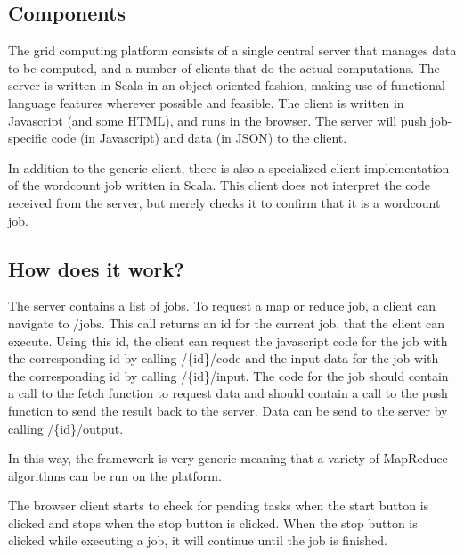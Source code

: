 
\subsection{Components}
The grid computing platform consists of a single central server that manages
data to be computed, and a number of clients that do the actual computations.
The server is written in Scala in an object-oriented fashion, making use of
functional language features wherever possible and feasible. The client is
written in Javascript (and some HTML), and runs in the browser. The server will
push job-specific code (in Javascript) and data (in JSON) to the client.

In addition to the generic client, there is also a specialized client
implementation of the wordcount job written in Scala. This client does not
interpret the code received from the server, but merely checks it to confirm
that it is a wordcount job.
	
	\subsection{How does it work?}
		The server contains a list of jobs. To request a map or reduce job, a client can navigate to /jobs. 
		This call returns an id for the current job, that the client can execute. Using this id, 
		the client can request the javascript code for the job with the corresponding id by calling /\{id\}/code
		and the input data for the job with the corresponding id by calling /\{id\}/input.
		The code for the job should contain a call to the fetch function to request data and should contain a call to the push
		function to send the result back to the server.
		Data can be send to the server by calling /\{id\}/output.
		
		In this way, the framework is very generic meaning that a variety of MapReduce algorithms can be run on the platform.
		
		The browser client starts to check for pending tasks when the start button is clicked and stops when the stop button is clicked.
		When the stop button is clicked while executing a job, it will continue until the job is finished.
